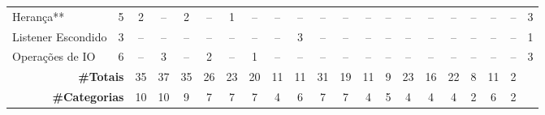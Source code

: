 \begin{table*}[t]
\begin{tabular}{@{}p{3.8cm}p{0.3cm}p{.2cm}p{.2cm}p{.2cm}p{.2cm}p{.2cm}p{.2cm}p{.2cm}p{.2cm}p{.2cm}p{.4cm}p{.4cm}p{.4cm}p{.4cm}p{.4cm}p{.4cm}p{.4cm}p{.4cm}p{.4cm}p{0.2cm}@{}}
Heran\c{c}a**								& \multicolumn{1}{c}{5} 	& \multicolumn{1}{c}{2} 	& \multicolumn{1}{c}{--} 	& \multicolumn{1}{c}{2} 	& \multicolumn{1}{c}{--} 	& \multicolumn{1}{c}{1} 	& \multicolumn{1}{c}{--} 	& \multicolumn{1}{c}{--} 	& \multicolumn{1}{c}{--} 	& \multicolumn{1}{c}{--} 	& \multicolumn{1}{c}{--} 	& \multicolumn{1}{c}{--} 	& \multicolumn{1}{c}{--} 	& \multicolumn{1}{c}{--} 	& \multicolumn{1}{c}{--} 	& \multicolumn{1}{c}{--} 	& \multicolumn{1}{c}{--} 	& \multicolumn{1}{c}{--} 	& \multicolumn{1}{c}{--} 	& \multicolumn{1}{c}{3} \\
Listener Escondido							& \multicolumn{1}{c}{3} 	& \multicolumn{1}{c}{--} 	& \multicolumn{1}{c}{--} 	& \multicolumn{1}{c}{--} 	& \multicolumn{1}{c}{--} 	& \multicolumn{1}{c}{--} 	& \multicolumn{1}{c}{--} 	& \multicolumn{1}{c}{--} 	& \multicolumn{1}{c}{3} 	& \multicolumn{1}{c}{--} 	& \multicolumn{1}{c}{--} 	& \multicolumn{1}{c}{--} 	& \multicolumn{1}{c}{--} 	& \multicolumn{1}{c}{--} 	& \multicolumn{1}{c}{--} 	& \multicolumn{1}{c}{--} 	& \multicolumn{1}{c}{--} 	& \multicolumn{1}{c}{--} 	& \multicolumn{1}{c}{--} 	& \multicolumn{1}{c}{1} \\
Opera\c{c}ões de IO							& \multicolumn{1}{c}{6} 	& \multicolumn{1}{c}{--} 	& \multicolumn{1}{c}{3} 	& \multicolumn{1}{c}{--} 	& \multicolumn{1}{c}{2} 	& \multicolumn{1}{c}{--} 	& \multicolumn{1}{c}{1} 	& \multicolumn{1}{c}{--} 	& \multicolumn{1}{c}{--} 	& \multicolumn{1}{c}{--} 	& \multicolumn{1}{c}{--} 	& \multicolumn{1}{c}{--} 	& \multicolumn{1}{c}{--} 	& \multicolumn{1}{c}{--} 	& \multicolumn{1}{c}{--} 	& \multicolumn{1}{c}{--} 	& \multicolumn{1}{c}{--} 	& \multicolumn{1}{c}{--} 	& \multicolumn{1}{c}{--} 	& \multicolumn{1}{c}{3} \\
\hline
\multicolumn{2}{r}{\textbf{\#Totais}}		& \multicolumn{1}{c}{35} 	& \multicolumn{1}{c}{37} 	& \multicolumn{1}{c}{35} 	& \multicolumn{1}{c}{26} 	& \multicolumn{1}{c}{23} 	& \multicolumn{1}{c}{20} 	& \multicolumn{1}{c}{11} 	& \multicolumn{1}{c}{11} 	& \multicolumn{1}{c}{31} 	& \multicolumn{1}{c}{19} 	& \multicolumn{1}{c}{11} 	& \multicolumn{1}{c}{9} 	& \multicolumn{1}{c}{23} 	& \multicolumn{1}{c}{16} 	& \multicolumn{1}{c}{22} 	& \multicolumn{1}{c}{8} 	& \multicolumn{1}{c}{11} 	& \multicolumn{1}{c}{2} \\
\hline
\multicolumn{2}{r}{\textbf{\#Categorias}}	& \multicolumn{1}{c}{10} 	& \multicolumn{1}{c}{10} 	& \multicolumn{1}{c}{9} 	& \multicolumn{1}{c}{7} 	& \multicolumn{1}{c}{7} 	& \multicolumn{1}{c}{7} 	& \multicolumn{1}{c}{4} 	& \multicolumn{1}{c}{6} 	& \multicolumn{1}{c}{7} 	& \multicolumn{1}{c}{7} 	& \multicolumn{1}{c}{4} 	& \multicolumn{1}{c}{5} 	& \multicolumn{1}{c}{4} 	& \multicolumn{1}{c}{4} 	& \multicolumn{1}{c}{4} 	& \multicolumn{1}{c}{2} 	& \multicolumn{1}{c}{6} 	& \multicolumn{1}{c}{2} \\

\end{tabular}
\end{table*}
